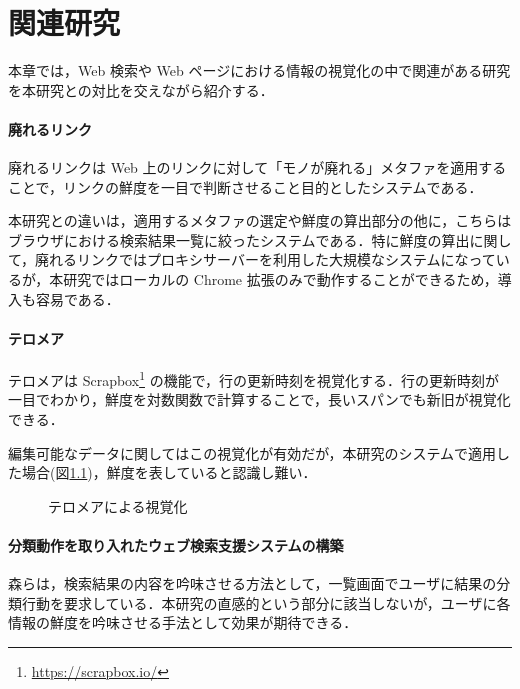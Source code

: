 \chapter{関連研究}
\label{chap:survey}

本章では，Web 検索や Web ページにおける情報の視覚化の中で関連がある研究を本研究との対比を交えながら紹介する．

\newpage

\subsubsection{廃れるリンク}

廃れるリンク\cite{dyinglink}は Web 上のリンクに対して「モノが廃れる」メタファを適用することで，リンクの鮮度を一目で判断させること目的としたシステムである．

本研究との違いは，適用するメタファの選定や鮮度の算出部分の他に，こちらはブラウザにおける検索結果一覧に絞ったシステムである．特に鮮度の算出に関して，廃れるリンクではプロキシサーバーを利用した大規模なシステムになっているが，本研究ではローカルの Chrome 拡張のみで動作することができるため，導入も容易である．

\subsubsection{テロメア}

テロメア\cite{telomere}は Scrapbox\footnote{\url{https://scrapbox.io/}} の機能で，行の更新時刻を視覚化する．行の更新時刻が一目でわかり，鮮度を対数関数で計算することで，長いスパンでも新旧が視覚化できる．

編集可能なデータに関してはこの視覚化が有効だが，本研究のシステムで適用した場合(図\ref{fig:ver-telomere})，鮮度を表していると認識し難い．

\begin{figure}[htbp]
  \begin{center}
  \end{center}
  \caption{テロメアによる視覚化}
  \label{fig:ver-telomere}
\end{figure}

\subsubsection{分類動作を取り入れたウェブ検索支援システムの構築}

森\cite{classify}らは，検索結果の内容を吟味させる方法として，一覧画面でユーザに結果の分類行動を要求している．本研究の直感的という部分に該当しないが，ユーザに各情報の鮮度を吟味させる手法として効果が期待できる．

